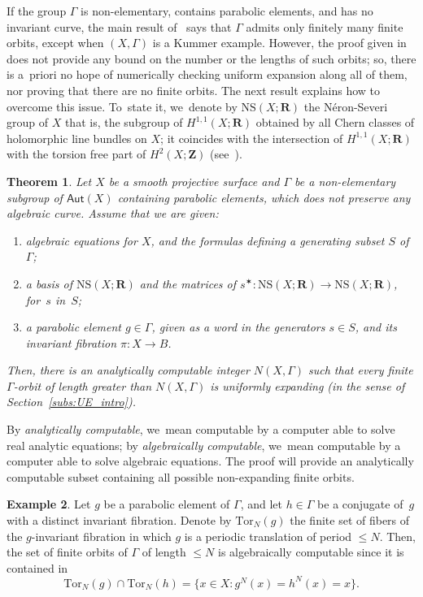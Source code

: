 \documentclass[11pt]{article}
\newenvironment{enumeratei}
{\bgroup\def\theenumi{\roman{enumi}}\def\theenumii{\arabic{enumii}}\begin{enumerate}}
{\end{enumerate}\egroup}
\let\sep :
\def\R{\mathbf{R}}
\def\Z{\mathbf{Z}}
\newcommand{\NS}{{\mathrm{NS}}}
\newcommand\Aut{\mathsf{Aut}}
\theoremstyle{plain}
\newtheorem{thm}{Theorem}[section]
\theoremstyle{definition}
\newtheorem{example}[thm]{Example}
\numberwithin{equation}{section}
\begin{document}
If the group $\Gamma$ is non-elementary, contains parabolic elements, and has no invariant curve, the main
result of~\cite{finite_orbits} says that $\Gamma$ admits only finitely many finite orbits, except when $(X,
\Gamma)$ is a Kummer example. However, the proof given in~\cite{finite_orbits} does not provide any bound
on the number or the lengths of such orbits; so, there is a~priori no hope of numerically checking
uniform expansion along all of them, nor proving that there are no finite orbits. The next result explains how to overcome this issue.
To~state it, we~denote by $\NS(X;\R)$ the Néron-Severi group of $X$ that is, the subgroup of $H^{1,1}(X;\R)$ obtained by all Chern classes of holomorphic line bundles on $X$; it coincides with the intersection of $H^{1,1}(X;\R)$ with the torsion free part of $H^2(X;\Z)$ (see~\cite[p.\,163]{griffiths-harris}).

\begin{thm}\label{thm:effective}
Let $X$ be a smooth projective surface and
$\Gamma$ be a non-elementary subgroup of $\Aut(X)$ containing parabolic elements, which does not
preserve any algebraic curve. Assume that we are given:
\begin{enumeratei}
\item\label{thm:effectivei}
algebraic equations for $X$, and the formulas defining a generating subset $S$ of~$\Gamma$;
\item\label{thm:effectiveii}
a basis of $\NS(X;\R)$ and the matrices of $s^\varstar\colon \NS(X;\R)\!\to\! \NS(X;\R)$, for~$s$ in~$S$;
\item\label{thm:effectiveiii}
a parabolic element $g\in \Gamma$, given as a word in the generators $s\in S$,
and its invariant fibration $\pi\colon X\to B$.
\end{enumeratei}
Then, there is an analytically computable integer $N(X, \Gamma)$
such that every finite $\Gamma$\nobreakdash-orbit of length greater than $N(X,\Gamma)$ is uniformly expanding (in the sense of Section~\ref{subs:UE_intro}).
\end{thm}

By \emph{analytically computable}, we~mean
computable by a computer able to solve real analytic equations; by \emph{algebraically computable}, we~mean
computable by a computer able to solve algebraic equations. The proof will provide an analytically computable subset containing all possible non-expanding finite orbits.

\begin{example} Let $g$ be a parabolic
element of $\Gamma$, and let $h\in \Gamma$ be a conjugate of~$g$ with a distinct invariant fibration.
Denote by $\mathrm{Tor}_N(g)$ the finite set of
fibers of the $g$-invariant fibration in which $g$ is a periodic translation of period $\leq N$.
Then, the set of finite orbits of $\Gamma$ of length $\leq N$ is algebraically computable since it is contained in
\begin{equation*}
\mathrm{Tor}_N(g)\cap \mathrm{Tor}_N(h) =\{x\in X\sep  g^N(x)=h^N(x)=x \}.
\end{equation*}
\end{example}
\end{document}
